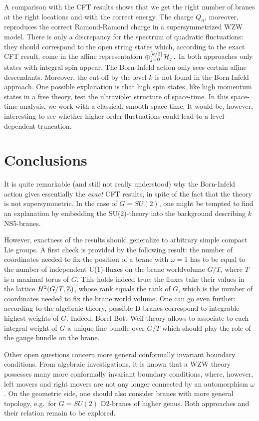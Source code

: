 \documentclass[a4paper,12pt]{article} \usepackage{amssymb,amsfonts,latexsym}
\begin{document}
A comparison with the CFT results shows that we get the right number of
branes at the right locations and with the correct energy. The charge $Q_n$,
moreover, reproduces the correct Ramond-Ramond charge in a supersymmetrized
WZW model.  There is only a discrepancy for the spectrum of quadratic 
fluctuations: they should correspond to the open string states which, according
to the exact CFT result, come in the affine representation
$ \oplus_{j=0}^{[k/2]} \, {\cal H}_j \,. $
In both approaches only states with integral spin appear. The Born-Infeld
action only sees certain affine descendants. Moreover, the cut-off
by the level $k$ is not found in the Born-Infeld approach. One possible
explanation is that high spin states, like high momentum states in a free
theory, test the ultraviolet structure of space-time. In this space-time
analysis, we work with a classical, smooth space-time. It would be, however, 
interesting to see whether higher order fluctuations could lead to a 
level-dependent truncation.

\section{Conclusions}

It is quite remarkable (and still not really understood) why the Born-Infeld 
action gives essentially the {\em exact} CFT results, in spite of the fact 
that the theory is not
supersymmetric. In the case of $G=SU(2)$, one might be tempted to find an
explanation by embedding the SU(2)-theory into the background describing
$k$ NS5-branes. 

However, exactness of the results should generalize to arbitrary simple 
compact Lie groups. A first check is provided by the following result: the 
number of coordinates needed to fix the position of a brane with $\omega=1$ has
to be equal to the number of independent U(1)-fluxes on the brane worldvolume
$G/T$, where $T$ is a maximal torus of $G$. This holds indeed true: the fluxes 
take their values in the lattice $H^2(G/T,{\mathbb Z})$, whose rank equals the rank 
of $G$, which is the number of coordinates needed to fix the brane world 
volume. One can go even further: according to the algebraic theory, possible 
D-branes correspond to integrable highest weights of $G$. Indeed, 
Borel-Bott-Weil 
theory allows to associate to each integral weight of $G$ a unique line bundle 
over $G/T$ which should play the role of the gauge bundle on the brane.

Other open questions concern more general conformally invariant boundary 
conditions. From algebraic investigations, it is known that a WZW theory 
possesses many more conformally invariant boundary conditions, where, 
however, left movers
and right movers are not any longer connected by an automorphism $\omega$.
On the geometric side, one should also consider branes with more general
topology, e.g.\ for $G=SU(2)$ D2-branes of higher genus. Both approaches and
their relation remain to be explored.
\end{document}
